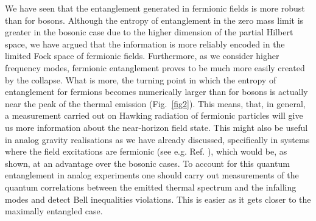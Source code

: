 We have seen that the entanglement generated in fermionic fields is more
robust than for bosons. Although the entropy of entanglement in the zero
mass limit is greater in the bosonic case due to the higher dimension of
the partial Hilbert space, we have argued that the information is more
reliably encoded in the limited Fock space of fermionic fields.
Furthermore, as we consider higher frequency modes, fermionic
entanglement proves to be much more   easily created by the collapse.
What is more, the turning point in which the entropy of entanglement for
fermions becomes numerically larger than for bosons is actually near the
peak of the thermal emission (Fig.~\ref{fig2}). This means, that, in
general, a measurement carried out on Hawking radiation of fermionic
particles will give us more information about the near-horizon field state.
This might also be useful in analog gravity realisations as we have already
discussed,  specifically in systems where the field excitations are
fermionic (see e.g. Ref. \cite{Volovik}), which would be, as shown, at an
advantage over the bosonic cases. To account for this quantum
entanglement in analog experiments one should  carry out measurements
of the quantum correlations between the emitted thermal spectrum and
the infalling modes and detect Bell inequalities violations. This is easier as
it gets closer to the maximally entangled case.
